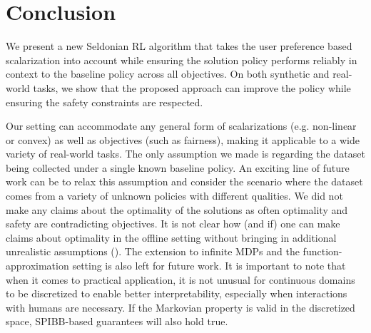 \section{Conclusion}
\label{sec:conclusion}

We present a new Seldonian RL algorithm that takes the user preference based scalarization into account while ensuring the solution policy performs reliably in context to the baseline policy across all objectives. 
On both synthetic and real-world tasks, we show that the proposed approach can improve the policy while ensuring the safety constraints are respected. 

Our setting can accommodate any general form of scalarizations (e.g. non-linear or convex) as well as objectives (such as fairness), making it applicable to a wide variety of real-world tasks. 
The only assumption we made is regarding the dataset being collected under a single known baseline policy. An exciting line of future work can be to relax this assumption and consider the scenario where the dataset comes from a variety of unknown policies with different qualities. 
We did not make any claims about the optimality of the solutions as often optimality and safety are contradicting objectives. It is not clear how (and if) one can make claims about optimality in the offline setting without bringing in additional unrealistic assumptions (). 
The extension to infinite MDPs and the function-approximation setting is also left for future work. 
It is important to note that when it comes to practical application, it is not unusual for continuous domains to be discretized to enable better interpretability, especially when interactions with humans are necessary. If the Markovian property is valid in the discretized space, SPIBB-based guarantees will also hold true.

